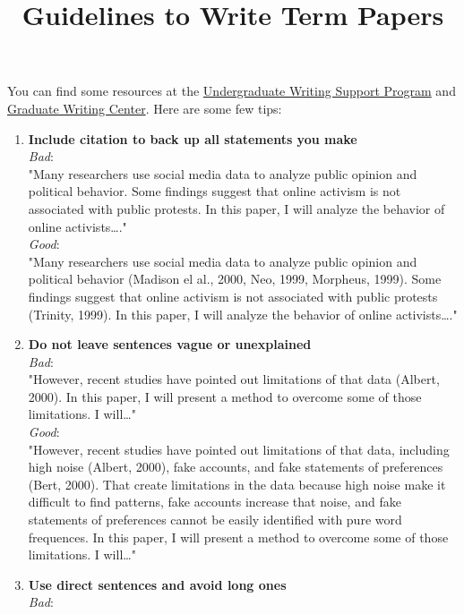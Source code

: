 \documentclass[a4paper]{article}
\date{}
\title{Guidelines to Write Term Papers}
\begin{document}
\maketitle
You can find some resources at the \href{https://arc.ucr.edu/writing}{Undergraduate Writing Support Program} and \href{https://gwc.ucr.edu/}{Graduate Writing Center}. Here are some few tips:


\begin{enumerate}
\item \textbf{Include citation to back up all statements you make}\\
\textit{Bad}:\\
"Many researchers use social media data to analyze public opinion and political behavior. Some findings suggest that online activism is not associated with public protests. In this paper, I will analyze the behavior of online activists\ldots{}."\\
\textit{Good}:\\
"Many researchers use social media data to analyze public opinion and political behavior (Madison el al., 2000, Neo, 1999, Morpheus, 1999). Some findings suggest that online activism is not associated with public protests (Trinity, 1999). In this paper, I will analyze the behavior of online activists\ldots{}."
\item \textbf{Do not leave sentences vague or unexplained}\\
\textit{Bad}:\\
"However, recent studies have pointed out limitations of that data (Albert, 2000). In this paper, I will present a method to overcome some of those limitations. I will\ldots{}"\\
\textit{Good}:\\
"However, recent studies have pointed out limitations of that data, including high noise (Albert, 2000), fake accounts, and fake statements of preferences (Bert, 2000). That create limitations in the data because high noise make it difficult to find patterns, fake accounts increase that noise, and fake statements of preferences cannot be easily identified with pure word frequences. In this paper, I will present a method to overcome some of those limitations. I will\ldots{}"\\
\item \textbf{Use direct sentences and avoid long ones}\\
\textit{Bad}:\\

\end{enumerate}
\end{document}
